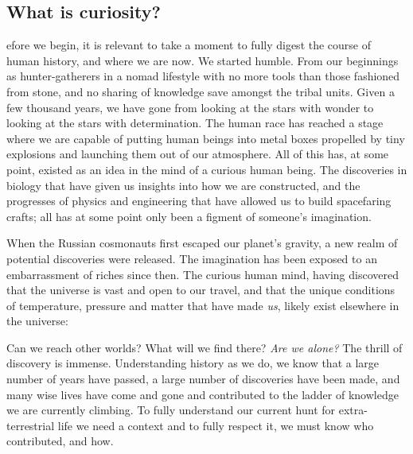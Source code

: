 \subsection*{What is curiosity?}
efore we begin, it is relevant to take a moment to fully digest the course of human history, and where we are now.
We started humble.
From our beginnings as hunter-gatherers in a nomad lifestyle with no more tools than those fashioned from stone, and no sharing of knowledge save amongst the tribal units.
Given a few thousand years, we have gone from looking at the stars with wonder to looking at the stars with determination.
The human race has reached a stage where we are capable of putting human beings into metal boxes propelled by tiny explosions and launching them out of our atmosphere.
All of this has, at some point, existed as an idea in the mind of a curious human being.
The discoveries in biology that have given us insights into how we are constructed, and the progresses of physics and engineering that have allowed us to build spacefaring crafts; all has at some point only been a figment of someone's imagination.

When the Russian cosmonauts first escaped our planet's gravity, a new realm of potential discoveries were released.
The imagination has been exposed to an embarrassment of riches since then.
The curious human mind, having discovered that the universe is vast and open to our travel, and that the unique conditions of temperature, pressure and matter that have made \textit{us}, likely exist elsewhere in the universe:

Can we reach other worlds?
What will we find there?
\textit{Are we alone?}
The thrill of discovery is immense.
Understanding history as we do, we know that a large number of years have passed, a large number of discoveries have been made, and many wise lives have come and gone and contributed to the ladder of knowledge we are currently climbing.
To fully understand our current hunt for extra-terrestrial life we need a context and to fully respect it, we must know who contributed, and how.